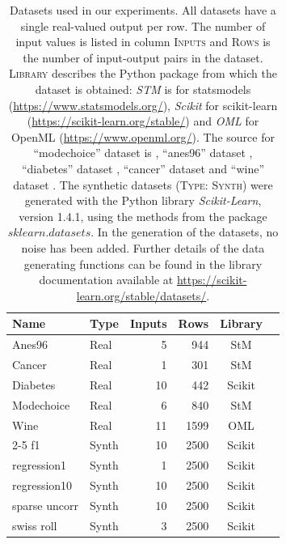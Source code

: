 \documentclass[conference]{IEEEtran}
\begin{document}
\begin{table}[tb]
 \begin{center}
 \begin{small}
 \begin{sc}
 \begin{tabular}{llrrcc}
 \toprule
 Name & Type & Inputs & Rows & Library \\
 
 \midrule
 Anes96 & Real & 5 & 944 & StM \\
 Cancer & Real & 1 & 301 & StM \\
 Diabetes & Real & 10 & 442 & Scikit \\
 Modechoice & Real & 6 & 840 & StM \\
 Wine & Real & 11 & 1599 & OML \\
 \cline{2-5} 
 f1 & Synth & 10 & 2500 & Scikit \\
 regression1 & Synth & 1 & 2500 & Scikit \\
 regression10 & Synth & 10 & 2500 & Scikit\\
 sparse uncorr & Synth & 10 & 2500 & Scikit\\
 swiss roll & Synth & 3 & 2500 & Scikit \\

 \bottomrule
 \end{tabular}
 \end{sc}
 \end{small}
 \end{center}
 \caption{Datasets used in our experiments. All datasets have a single real-valued output per row. 
 The number of input values is listed in column \textsc{Inputs} and \textsc{Rows} is the number of input-output pairs in the dataset. 
 \textsc{Library} describes the Python package from which the dataset is obtained: \emph{STM} is for statsmodels (\url{https://www.statsmodels.org/}), \emph{Scikit} for scikit-learn (\url{https://scikit-learn.org/stable/}) and \emph{OML} for OpenML (\url{https://www.openml.org/}).
 The source for ``modechoice'' dataset is \cite{greene2011modechoice}, ``anes96'' dataset \cite{anes1996}, ``diabetes'' dataset \cite{efron2004least}, ``cancer'' dataset \cite{rice_cancer} and ``wine'' dataset \cite{cortez2009modeling}.
 The synthetic datasets (\textsc{Type: Synth}) were generated with the Python library \emph{Scikit-Learn}, version 1.4.1, using the methods from the package $sklearn.datasets$. 
 In the generation of the datasets, no noise has been added.
 Further details of the data generating functions can be found in the library documentation available at \url{https://scikit-learn.org/stable/datasets/}.
 }
 \label{tab:data-table} 
\end{table}
\end{document}
